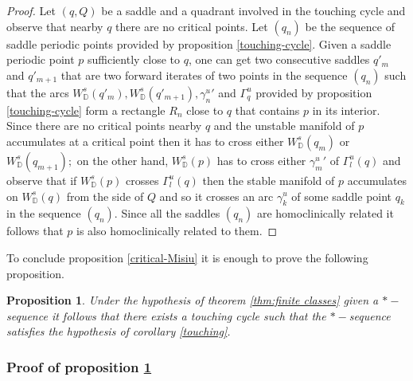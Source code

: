 \documentclass[a4paper,11pt]{article}
\newtheorem{proposition}[lemma]{Proposition}
\theoremstyle{definition}
\def\DD{{\mathbb D}}
\def\ga{\gamma}
\def\Ga{\Gamma}
\def\Ga{\Gamma}
\begin{document}
\begin{proof} Let $(q, Q)$ be a saddle and a quadrant involved in the touching cycle and observe that nearby $q$ there are no critical points. Let $(q_n)$ be the sequence of saddle periodic points provided by proposition \ref{touching-cycle}. Given a saddle periodic point $p$ sufficiently close to $q$, one can get two consecutive saddles $q'_m$ and $q'_{m+1}$ that are two forward iterates of two points in the sequence $(q_n)$ such that the arcs $W^s_\DD(q'_m), W^s_\DD(q'_{m+1}), {\ga^u_n}'$ and $\Ga^u_q$ provided by proposition \ref{touching-cycle} form a rectangle $R_n$ close to $q$ that contains $p$ in its interior. Since there are no critical points nearby $q$ and the unstable manifold of $p$ accumulates at a critical point then it has to cross either $W^s_\DD(q_m)$ or $W^s_\DD(q_{m+1});$ on the other hand, $W^s_\DD(p)$ has to cross either ${\ga^u_m}'$ of $\Ga^u_l(q)$ and observe that  if $W^s_\DD(p)$ crosses $\Ga^u_l(q)$ then the stable manifold of $p$ accumulates on $W^s_\DD(q)$ from the side of $Q$ and so it crosses an arc $\ga^u_k$ of some saddle point $q_k$     in the sequence $(q_n).$ Since all the saddles $(q_n)$ are homoclinically related it follows that $p$ is also homoclinically related to them.

\end{proof}

To conclude proposition \ref{critical-Misiu}  it is enough to prove the following proposition.

\begin{proposition}\label{prop:*-touching} Under the hypothesis of theorem \ref{thm:finite classes} given a $*-$sequence it follows that  there exists a touching cycle such that the $*-$sequence satisfies the hypothesis of corollary \ref{touching}.

    
\end{proposition}






\subsubsection{Proof of proposition \ref{prop:*-touching}}
\end{document}
